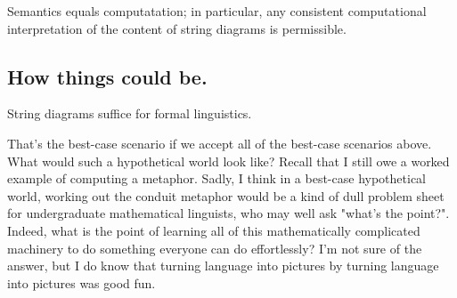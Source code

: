 \begin{thesis}
Semantics equals computatation; in particular, any consistent computational interpretation of the content of string diagrams is permissible.
\end{thesis}

\subsection{How things could be.}

\begin{thesis}
String diagrams suffice for formal linguistics.
\end{thesis}

That's the best-case scenario if we accept all of the best-case scenarios above. What would such a hypothetical world look like? Recall that I still owe a worked example of computing a metaphor. Sadly, I think in a best-case hypothetical world, working out the conduit metaphor would be a kind of dull problem sheet for undergraduate mathematical linguists, who may well ask "what's the point?". Indeed, what is the point of learning all of this mathematically complicated machinery to do something everyone can do effortlessly? I'm not sure of the answer, but I do know that turning language into pictures by turning language into pictures was good fun.

\newpage

